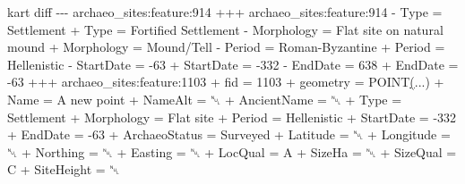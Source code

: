 \documentclass[
  letterpaper,
  DIV=11,
  numbers=noendperiod]{scrartcl}
\newenvironment{Shaded}{\begin{snugshade}}{\end{snugshade}}
\newcommand{\AttributeTok}[1]{\textcolor[rgb]{1.00,0.47,0.78}{#1}}
\newcommand{\ErrorTok}[1]{\textcolor[rgb]{1.00,0.33,0.33}{\underline{#1}}}
\newcommand{\ExtensionTok}[1]{\textcolor[rgb]{0.55,0.91,0.99}{#1}}
\newcommand{\KeywordTok}[1]{\textcolor[rgb]{1.00,0.47,0.78}{#1}}
\newcommand{\NormalTok}[1]{\textcolor[rgb]{0.97,0.97,0.95}{#1}}
\begin{document}
\begin{tcolorbox}
\begin{Shaded}
\begin{Highlighting}[]
\ExtensionTok{kart}\NormalTok{ diff}
\ExtensionTok{{-}{-}{-}}\NormalTok{ archaeo\_sites:feature:914}
\ExtensionTok{+++}\NormalTok{ archaeo\_sites:feature:914}
\ExtensionTok{{-}}\NormalTok{                                     Type = Settlement}
\ExtensionTok{+}\NormalTok{                                     Type = Fortified Settlement}
\ExtensionTok{{-}}\NormalTok{                               Morphology = Flat site on natural mound}
\ExtensionTok{+}\NormalTok{                               Morphology = Mound/Tell}
\ExtensionTok{{-}}\NormalTok{                                   Period = Roman{-}Byzantine}
\ExtensionTok{+}\NormalTok{                                   Period = Hellenistic}
\ExtensionTok{{-}}\NormalTok{                                StartDate = }\AttributeTok{{-}63}
\ExtensionTok{+}\NormalTok{                                StartDate = }\AttributeTok{{-}332}
\ExtensionTok{{-}}\NormalTok{                                  EndDate = 638}
\ExtensionTok{+}\NormalTok{                                  EndDate = }\AttributeTok{{-}63}
\ExtensionTok{+++}\NormalTok{ archaeo\_sites:feature:1103}
\ExtensionTok{+}\NormalTok{                                      fid = 1103}
\ExtensionTok{+}\NormalTok{                                 geometry = POINT}\ErrorTok{(}\ExtensionTok{...}\KeywordTok{)}
\ExtensionTok{+}\NormalTok{                                     Name = A new point}
\ExtensionTok{+}\NormalTok{                                  NameAlt = ␀}
\ExtensionTok{+}\NormalTok{                              AncientName = ␀}
\ExtensionTok{+}\NormalTok{                                     Type = Settlement}
\ExtensionTok{+}\NormalTok{                               Morphology = Flat site}
\ExtensionTok{+}\NormalTok{                                   Period = Hellenistic}
\ExtensionTok{+}\NormalTok{                                StartDate = }\AttributeTok{{-}332}
\ExtensionTok{+}\NormalTok{                                  EndDate = }\AttributeTok{{-}63}
\ExtensionTok{+}\NormalTok{                            ArchaeoStatus = Surveyed}
\ExtensionTok{+}\NormalTok{                                 Latitude = ␀}
\ExtensionTok{+}\NormalTok{                                Longitude = ␀}
\ExtensionTok{+}\NormalTok{                                 Northing = ␀}
\ExtensionTok{+}\NormalTok{                                  Easting = ␀}
\ExtensionTok{+}\NormalTok{                                  LocQual = A}
\ExtensionTok{+}\NormalTok{                                   SizeHa = ␀}
\ExtensionTok{+}\NormalTok{                                 SizeQual = C}
\ExtensionTok{+}\NormalTok{                               SiteHeight = ␀}

\end{Highlighting}
\end{Shaded}
\end{tcolorbox}
\end{document}
